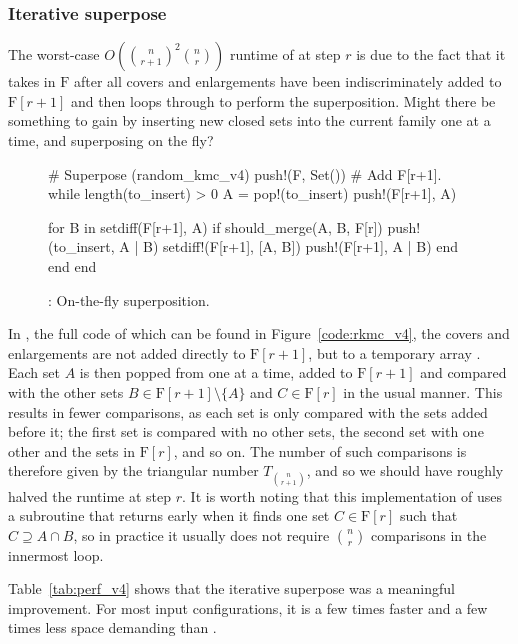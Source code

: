 \subsubsection{Iterative superpose}
The worst-case $O({\binom{n}{r+1}}^2{\binom{n}{r}})$ runtime of  at step $r$ is due to the fact that it takes in $\mathrm{F}$ after all covers and enlargements have been indiscriminately added to $\mathrm{F}[r+1]$ and then loops through to perform the superposition. Might there be something to gain by inserting new closed sets into the current family one at a time, and superposing on the fly?

\begin{figure}
\begin{jllisting}
  # Superpose (random_kmc_v4)
  push!(F, Set()) # Add F[r+1].
  while length(to_insert) > 0
    A = pop!(to_insert)
    push!(F[r+1], A)

    for B in setdiff(F[r+1], A)
      if should_merge(A, B, F[r])
        push!(to_insert, A | B)
        setdiff!(F[r+1], [A, B])
        push!(F[r+1], A | B)
      end
    end
  end
\end{jllisting}
\caption{: On-the-fly superposition.}
\end{figure}

In , the full code of which can be found in Figure~\ref{code:rkmc_v4}, the covers and enlargements are not added directly to $\mathrm{F}[r+1]$, but to a temporary array . Each set $A$ is then popped from  one at a time, added to $\mathrm{F}[r+1]$ and compared with the other sets $B \in \mathrm{F}[r+1] \setminus \{A\}$ and $C \in \mathrm{F}[r]$ in the usual  manner. This results in fewer comparisons, as each set is only compared with the sets added before it; the first set is compared with no other sets, the second set with one other and the sets in $\mathrm{F}[r]$, and so on. The number of such comparisons is therefore given by the triangular number $T_{\binom{n}{r+1}}$, and so we should have roughly halved the runtime at step $r$. It is worth noting that this implementation of  uses a subroutine  that returns early when it finds one set $C \in \mathrm{F}[r]$ such that $C \supseteq A \cap B$, so in practice it usually does not require $\binom{n}{r}$ comparisons in the innermost loop.

Table~\ref{tab:perf_v4} shows that the iterative superpose was a meaningful improvement. For most input configurations, it is a few times faster and a few times less space demanding than .


